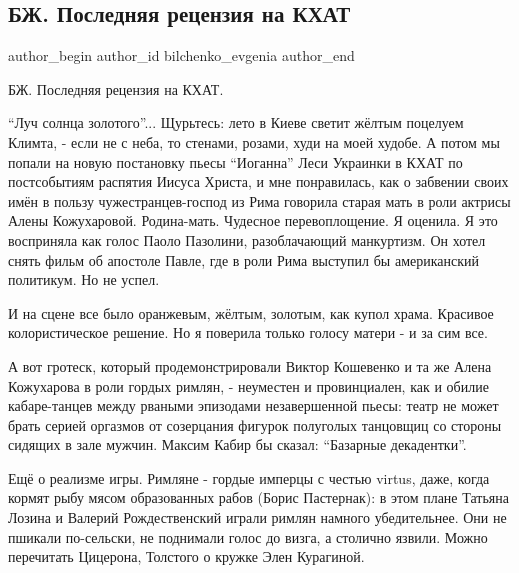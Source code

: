  
 
 
 
 
 
\subsection{БЖ. Последняя рецензия на КХАТ}
\label{sec:07_06_2021.fb.bilchenko_evgenia.1.recenzia_khat}
\ifcmt
 author_begin
   author_id bilchenko_evgenia
 author_end
\fi

БЖ. Последняя рецензия на КХАТ.

\enquote{Луч солнца золотого}... Щурьтесь: лето в Киеве светит жёлтым поцелуем Климта,
- если не с неба, то стенами, розами, худи на моей худобе. А потом мы попали на
новую постановку пьесы \enquote{Иоганна} Леси Украинки в КХАТ по постсобытиям распятия
Иисуса Христа, и мне понравилась, как о забвении своих имён в пользу
чужестранцев-господ из Рима говорила старая мать в роли актрисы Алены
Кожухаровой. Родина-мать. Чудесное перевоплощение. Я оценила. Я это восприняла
как голос Паоло Пазолини, разоблачающий манкуртизм. Он хотел снять фильм об
апостоле Павле, где в роли Рима выступил бы американский политикум. Но не
успел. 

И на сцене все было оранжевым, жёлтым, золотым, как купол храма.  Красивое
колористическое решение. Но я поверила только голосу матери - и за сим все. 

А вот гротеск, который продемонстрировали Виктор Кошевенко и та же Алена
Кожухарова в роли гордых римлян, - неуместен и провинциален, как и обилие
кабаре-танцев между рваными эпизодами незавершенной пьесы: театр не может брать
серией оргазмов  от созерцания фигурок полуголых танцовщиц со стороны сидящих в
зале мужчин. Максим Кабир бы сказал: \enquote{Базарные декадентки}.

Ещё о реализме игры. Римляне - гордые имперцы с честью virtus, даже, когда
кормят рыбу мясом образованных рабов (Борис Пастернак): в этом плане Татьяна
Лозина  и Валерий Рождественский играли римлян намного убедительнее. Они не
пшикали по-сельски, не поднимали голос до визга, а столично язвили. Можно
перечитать Цицерона, Толстого о кружке Элен Курагиной. 


